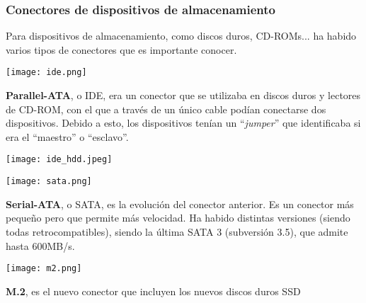 \subsubsection{Conectores de dispositivos de almacenamiento}

Para dispositivos de almacenamiento, como discos duros, CD-ROMs... ha habido varios tipos de conectores que es importante conocer.

\begin{minipage}{0.15\linewidth}
    \texttt{[image: ide.png]}
\end{minipage}
\hfill
\begin{minipage}{0.8\linewidth}
    \textbf{Parallel-ATA}, o IDE, era un conector que se utilizaba en discos duros y lectores de CD-ROM, con el que a través de un único cable podían conectarse dos dispositivos. Debido a esto, los dispositivos tenían un “\textit{jumper}” que identificaba si era el “maestro” o “esclavo”.
\end{minipage}

\begin{center}
    \texttt{[image: ide\_hdd.jpeg]}
\end{center}


\begin{minipage}{0.15\linewidth}
    \texttt{[image: sata.png]}
\end{minipage}
\hfill
\begin{minipage}{0.8\linewidth}
    \textbf{Serial-ATA}, o SATA, es la evolución del conector anterior. Es un conector más pequeño pero que permite más velocidad. Ha habido distintas versiones (siendo todas retrocompatibles), siendo la última SATA 3 (subversión 3.5), que admite hasta 600MB/s.
\end{minipage}


\begin{minipage}{0.15\linewidth}
    \texttt{[image: m2.png]}
\end{minipage}
\hfill
\begin{minipage}{0.8\linewidth}
    \textbf{M.2}, es el nuevo conector que incluyen los nuevos discos duros SSD
\end{minipage}

%
%
